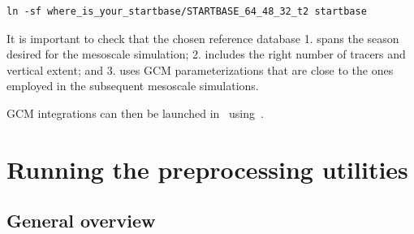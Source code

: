 \begin{verbatim}
ln -sf where_is_your_startbase/STARTBASE_64_48_32_t2 startbase
\end{verbatim}

\sk
It is important to check that the chosen reference database 1. spans the season desired for the mesoscale simulation; 2. includes the right number of tracers and vertical extent; and 3. uses GCM parameterizations that are close to the ones employed in the subsequent mesoscale simulations.

\sk
GCM integrations can then be launched in~ using~.

\mk
\section{Running the preprocessing utilities}

\sk
\subsection{General overview}\label{changeparam}

